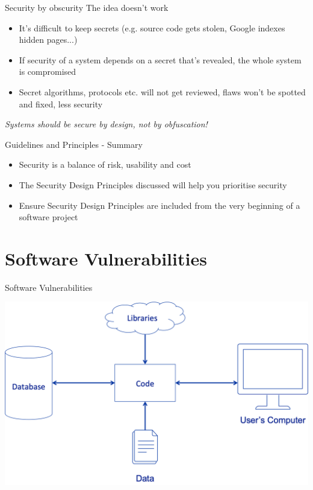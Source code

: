 \documentclass{beamer}
\begin{document}
\begin{frame}{Security by obscurity}
The idea doesn’t work
\begin{itemize}
\item It’s difficult to keep secrets (e.g. source code gets stolen, Google indexes hidden pages...)
\item If security of a system depends on a secret that's revealed, the whole system is compromised
\item Secret algorithms, protocols etc. will not get reviewed, flaws won’t be spotted and fixed, less security
\end{itemize}
\centering
{ \color{red} \textit{Systems should be secure by design, not by obfuscation!} }
\end{frame}

\begin{frame}{Guidelines and Principles - Summary}
\begin{itemize}
\item Security is a balance of risk, usability and cost
\item The Security Design Principles discussed will help you prioritise security
\item Ensure Security Design Principles are included from the very beginning of a software project
\end{itemize}
\end{frame}


\section{Software Vulnerabilities}
\frame{\sectionpage}

\begin{frame}{Software Vulnerabilities}
\begin{center}
\includegraphics[width=0.8\linewidth]{software-vulnerabilities.png}
\end{center}
\end{frame}
\end{document}
